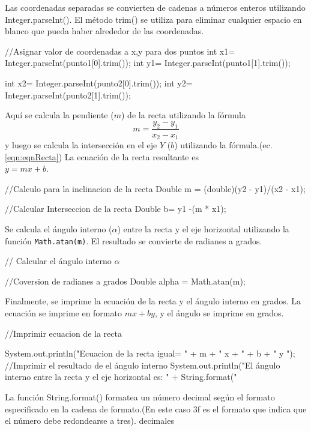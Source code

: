 Las coordenadas separadas se convierten de cadenas a números enteros utilizando Integer.parseInt(). El método trim() se utiliza para eliminar cualquier espacio en blanco que pueda haber alrededor de las coordenadas.

\begin{javaCode}
    //Asignar valor de coordenadas a x,y para dos puntos
    int x1= Integer.parseInt(punto1[0].trim());
    int y1= Integer.parseInt(punto1[1].trim());
       
    int x2= Integer.parseInt(punto2[0].trim());
    int y2= Integer.parseInt(punto2[1].trim());
\end{javaCode}

Aquí se calcula la pendiente ($m$) de la recta utilizando la fórmula
\[
m = \frac{{y_2 - y_1}}{{x_2 - x_1}}
\]
y luego se calcula la intersección en el eje $Y$ ($b$) utilizando la fórmula.(ec. \ref{eqn:eqnRecta})
La ecuación de la recta resultante es\\ $y = mx + b$.

\begin{javaCode}
    //Calculo para la inclinacion de la recta  
    Double m = (double)(y2 - y1)/(x2 - x1);
       
    //Calcular Interseccion de la recta
    Double b= y1 -(m * x1);
\end{javaCode}
Se calcula el ángulo interno (\(\alpha\)) entre la recta y el eje horizontal utilizando la función \texttt{Math.atan(m)}. El resultado se convierte de radianes a grados.\\
\begin{javaCode}
    // Calcular el ángulo interno $\alpha$
        
        //Coversion de radianes a grados
        Double alpha = Math.atan(m);
        
\end{javaCode}

Finalmente, se imprime la ecuación de la recta y el ángulo interno en grados. La ecuación se imprime en formato \(mx + by\), y el ángulo se imprime en grados.
\begin{javaCode}
   //Imprimir ecuacion de la recta
        
        System.out.println("Ecuacion de la recta igual= \n" +
                 m + " x + " + b + " y ");
       //Imprimir el resultado de el ángulo interno 
        System.out.println("El ángulo interno entre la recta y el eje horizontal es: " 
                + String.format("%
                
\end{javaCode}
La función String.format() formatea un número decimal según el formato especificado en la cadena de formato.(En este caso 3f es el formato que indica que el número debe redondearse a tres). decimales
